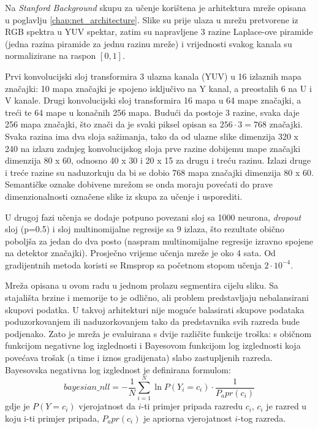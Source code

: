 \documentclass[times, utf8, diplomski, numeric]{fer}
\begin{document}
Na \textit{Stanford Background} skupu za učenje korištena je arhitektura mreže opisana u poglavlju \ref{chap:net_architecture}. Slike su prije ulaza u mrežu pretvorene iz RGB spektra u YUV spektar, zatim su napravljene 3 razine Laplace-ove piramide (jedna razina piramide za jednu razinu mreže) i vrijednosti svakog kanala su normalizirane na raspon $\left[ 0, 1 \right]$.

Prvi konvolucijski sloj transformira 3 ulazna kanala (YUV) u 16 izlaznih mapa značajki: 10 mapa značajki je spojeno isključivo na Y kanal, a preostalih 6 na U i V kanale. Drugi konvolucijski sloj transformira 16 mapa u 64 mape značajki, a treći te 64 mape u konačnih 256 mapa. Budući da postoje 3 razine, svaka daje 256 mapa značajki, što znači da je svaki piksel opisan sa $256 \cdot 3 = 768$ značajki. Svaka razina ima dva sloja sažimanja, tako da od ulazne slike dimenzija 320 x 240 na izlazu zadnjeg konvolucijskog sloja prve razine dobijemu mape značajki dimenzija 80 x 60, odnosno 40 x 30 i 20 x 15 za drugu i treću razinu. Izlazi druge i treće razine su naduzorkuju da bi se dobio 768 mapa značajki dimenzija 80 x 60. Semantičke oznake dobivene mrežom se onda moraju povećati do prave dimenzionalnosti označene slike iz skupa za učenje i usporediti.

U drugoj fazi učenja se dodaje potpuno povezani sloj sa 1000 neurona, \textit{dropout} sloj (p=0.5) i sloj multinomijalne regresije sa 9 izlaza, što rezultate obično poboljša za jedan do dva posto (naspram multinomijalne regresije izravno spojene na detektor značajki). Prosječno vrijeme učenja mreže je oko 4 sata. Od gradijentnih metoda koristi se Rmsprop sa početnom stopom učenja $2 \cdot 10^{-4}$.

Mreža opisana u ovom radu u jednom prolazu segmentira cijelu sliku. Sa stajališta brzine i memorije to je odlično, ali problem predstavljaju nebalansirani skupovi podatka. U takvoj arhitekturi nije moguće balasirati skupove podataka poduzorkovanjem ili naduzorkovanjem tako da predstavnika svih razreda bude podjenako. Zato je mreža je evaluirana s dvije različite funkcije troška: s običnom funkcijom negativne log izglednosti i Bayesovom funkcijom log izglednosti\cite{daylac} koja povećava trošak (a time i iznos gradijenata) slabo zastupljenih razreda. Bayesovska negativna log izglednost je definirana formulom:
\begin{equation}
  bayesian\_nll = - \frac{1}{N} \sum_{i=1}^{N} \ln P(Y_i = c_i) \cdot \frac{1}{P_apr(c_i)}
\end{equation}
gdje je $P(Y = c_i)$ vjerojatnost da $i$-ti primjer pripada razredu $c_i$, $c_i$ je razred u koju i-ti primjer pripada, $P_apr(c_i)$ je apriorna vjerojatnost $i$-tog razreda.
\end{document}
